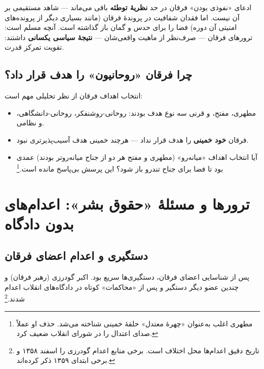 \documentclass[12pt,a4paper]{book}
\newcommand{\keyword}[1]{\textbf{\textcolor{cPrimary}{#1}}}
\begin{document}
\begin{noteBox}
ادعای «نفوذی بودن» فرقان در حد \keyword{نظریهٔ توطئه} باقی می‌ماند — شاهد مستقیمی بر آن نیست. اما فقدان شفافیت در پروندهٔ فرقان (مانند بسیاری دیگر از پرونده‌های امنیتی آن دوره) فضا را برای حدس و گمان باز گذاشته است. آنچه مسلم است: ترورهای فرقان — صرف‌نظر از ماهیت واقعی‌شان — \keyword{نتیجهٔ سیاسی یکسانی} داشتند: تقویت تمرکز قدرت.
\end{noteBox}

\subsection{چرا فرقان «روحانیون» را هدف قرار داد؟}

انتخاب اهداف فرقان از نظر تحلیلی مهم است:

\begin{itemize}[label=\textcolor{cPrimary}{$\blacktriangleright$}, rightmargin=2em]
    \item مطهری، مفتح، و قرنی سه نوع هدف بودند: روحانی-روشنفکر، روحانی-دانشگاهی، و نظامی.
    \item فرقان \keyword{خود خمینی} را هدف قرار نداد — هرچند خمینی هدف آسیب‌پذیرتری نبود.
    \item آیا انتخاب اهداف «میانه‌رو» (مطهری و مفتح هر دو از جناح میانه‌روتر بودند) عمدی بود تا فضا برای جناح تندرو باز شود؟ این پرسش بی‌پاسخ مانده است.\footnote{مطهری اغلب به‌عنوان «چهرهٔ معتدل» حلقهٔ خمینی شناخته می‌شد. حذف او عملاً صدای اعتدال را در شورای انقلاب ضعیف کرد.}
\end{itemize}

\section{ترورها و مسئلهٔ «حقوق بشر»: اعدام‌های بدون دادگاه}

\subsection{دستگیری و اعدام اعضای فرقان}

پس از شناسایی اعضای فرقان، دستگیری‌ها سریع بود. اکبر گودرزی (رهبر فرقان) و چندین عضو دیگر دستگیر و پس از «محاکمات» کوتاه در دادگاه‌های انقلاب اعدام شدند.\footnote{تاریخ دقیق اعدام‌ها محل اختلاف است. برخی منابع اعدام گودرزی را اسفند ۱۳۵۸ و برخی ابتدای ۱۳۵۹ ذکر کرده‌اند.}
\end{document}
